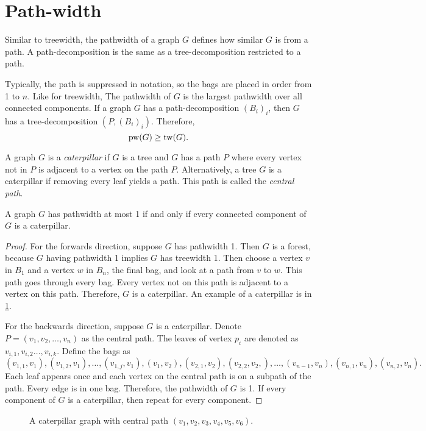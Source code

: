 \section{Path-width}\label{sec:Pathwidth}
Similar to treewidth, the pathwidth of a graph \(G\) defines how similar $G$ is from a path. A path-decomposition is the same as a tree-decomposition restricted to a path. 

Typically, the path is suppressed in notation, so the bags are placed in order from 1 to $n$. Like for treewidth, The pathwidth of \(G\) is the largest pathwidth over all connected components.
If a graph $G$ has a path-decomposition \({(B_i)}_i\), then $G$ has a tree-decomposition \(\left(P,{(B_i)}_i\right)\). Therefore,
\begin{equation*}
	\operatorname{pw}(G) \geq \operatorname{tw}(G).
\end{equation*}

A graph \(G\) is a \textit{caterpillar} if \(G\) is a tree and $G$ has a path \(P\) where every vertex not in $P$ is adjacent to a vertex on the path \(P\). Alternatively, a tree \(G\) is a caterpillar if removing every leaf yields a path. This path is called the \textit{central path}.
\begin{proposition}
	A graph $G$ has pathwidth at most 1 if and only if every connected component of $G$ is a caterpillar.
\end{proposition}
\begin{proof}
	For the forwards direction, suppose \(G\) has pathwidth 1. Then $G$ is a forest, because $G$ having pathwidth 1 implies $G$ has treewidth 1. Then choose a vertex \(v\) in \(B_1\) and a vertex \(w\) in \(B_n\), the final bag, and look at a path from \(v\) to \(w\). This path goes through every bag. Every vertex not on this path is adjacent to a vertex on this path. Therefore, $G$ is a caterpillar. 
	An example of a caterpillar is in \cref{fig:caterpillar}.

	For the backwards direction, suppose \(G\) is a caterpillar.
	Denote \(P =\left( v_1, v_2, \ldots, v_n\right)\) as the central path. The leaves of vertex \(p_i\) are denoted as \(v_{i, 1}, v_{i, 2} \dots, v_{i, k}\). Define the bags as
	\begin{equation*}
		(v_{1, 1}, v_1), (v_{1, 2}, v_1) ,\ldots ,(v_{1, j}, v_1),  (v_1, v_2), (v_{2, 1}, v_2), (v_{2,2}, v_2,),\ldots ,(v_{n-1}, v_n), (v_{n,1}, v_n), (v_{n,2}, v_n) .
	\end{equation*}
	Each leaf appears once and each vertex on the central path is on a subpath of the path. Every edge is in one bag. Therefore, the pathwidth of \(G\) is 1. If every component of $G$ is a caterpillar, then repeat for every component.
\end{proof}
\begin{figure}[h!]
	\centering
	
	\caption[Caterpillar graph]{A caterpillar graph with central path \((v_1, v_2, v_3, v_4, v_5, v_6)\).}\label{fig:caterpillar}
\end{figure}

